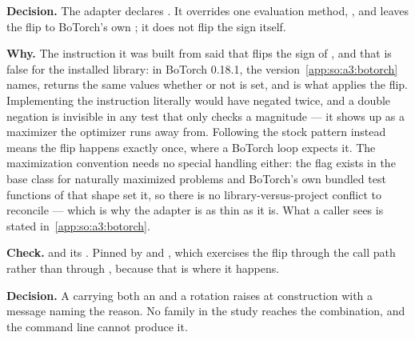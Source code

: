 \label{app:so:a4:r38}

\textbf{Decision.} The adapter declares
. It overrides one evaluation
method, , and leaves the  flip to BoTorch's own
; it does not flip the sign itself.

\textbf{Why.} The instruction it was built from said that 
flips the sign of , and that is false for the installed
library: in BoTorch 0.18.1, the version~\ref{app:so:a3:botorch} names,
 returns the same values whether or not 
is set, and  is what applies the flip. Implementing the
instruction literally would have negated twice, and a double negation is
invisible in any test that only checks a magnitude --- it shows up as a
maximizer the optimizer runs away from. Following the stock pattern instead
means the flip happens exactly once, where a BoTorch loop expects it. The
maximization convention needs no special handling either: the
 flag exists in the base class for
naturally maximized problems and BoTorch's own bundled test functions of that
shape set it, so there is no library-versus-project conflict to reconcile ---
which is why the adapter is as thin as it is. What a caller sees is stated
in~\ref{app:so:a3:botorch}.

\begin{sloppypar}
\textbf{Check.}  and
its . Pinned by
and , which exercises
the flip through the call path rather than through
, because that is where it happens.
\end{sloppypar}

\label{app:so:a4:r39}

\textbf{Decision.} A  carrying both an
 and a rotation raises at construction with a message
naming the reason. No family in the study reaches the combination, and the
command line cannot produce it.

